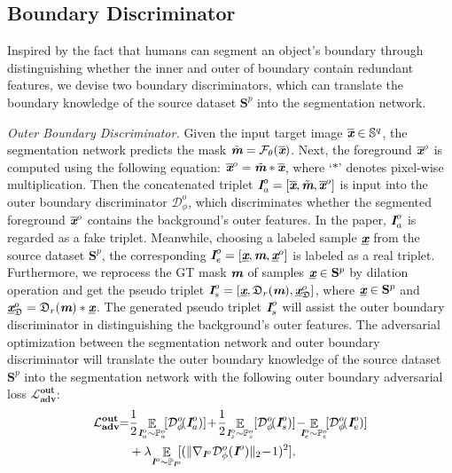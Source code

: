 \documentclass[letterpaper]{article} %
\begin{document}
\subsection{Boundary Discriminator}
Inspired by the fact that humans can segment an object's boundary through distinguishing whether the inner and outer of boundary contain redundant features, we devise two boundary discriminators, which can translate the boundary knowledge of the source dataset $\mathbf{S}^p$ into the segmentation network.

\emph{Outer Boundary Discriminator.}
Given the input target image $\overline{\textbf{\em x}}\in \mathbb{S}^q$, the segmentation network predicts the mask $\tilde{\textbf{\em m}}=\mathcal{F}_{\theta}(\overline{\textbf{\em x}})$. Next, the foreground $\overline{\textbf{\em x}}^o$ is computed using the following equation: $\overline{\textbf{\em x}}^o=\tilde{\textbf{\em m}}*\overline{\textbf{\em x}}$, where `$*$' denotes pixel-wise multiplication. Then the concatenated triplet $\textbf{\em I}^o_a=[\overline{\textbf{\em x}},\tilde{\textbf{\em m}},\overline{\textbf{\em x}}^o]$ is input into the outer boundary discriminator $\mathcal{D}^o_{\phi}$, which discriminates whether the segmented foreground $\overline{\textbf{\em x}}^o$ contains the background's outer features. In the paper, $\textbf{\em I}^o_a$ is regarded as a fake triplet.
Meanwhile, choosing a labeled sample $\underline{\textbf{\em x}}$ from the source dataset $\mathbf{S}^p$, the corresponding $\textbf{\em I}^o_e=[\underline{\textbf{\em x}},\textbf{\em m},\underline{\textbf{\em x}}^o]$ is labeled as a real triplet.
Furthermore, we reprocess the GT mask $\textbf{\em m}$ of samples $\underline{\textbf{\em x}}\in \mathbf{S}^p$ by dilation operation and get the pseudo triplet $\textbf{\em I}^o_s=[\underline{\textbf{\em x}},\mathfrak{D}_r(\textbf{\em m}),\underline{\textbf{\em x}}^o_{\mathfrak{D}}]$, where $ \underline{\textbf{\em x}}\in \mathbf{S}^p$ and $\underline{\textbf{\em x}}^o_{\mathfrak{D}}=\mathfrak{D}_r(\textbf{\em m})*\underline{\textbf{\em x}}$.
The generated pseudo triplet $\textbf{\em I}^o_s$ will assist the outer boundary discriminator in distinguishing the background's outer features.
The adversarial optimization between the segmentation network and outer boundary discriminator will translate the outer boundary knowledge of the source dataset $\mathbf{S}^p$ into the segmentation network with the following outer boundary adversarial loss $\mathbf{\mathcal{L}^{out}_{adv}}$:
\begin{equation}\label{eq4}
\begin{split}
\mathbf{\mathcal{L}^{out}_{adv}}\!\!= & \frac{1}{2}\!\mathop{\mathbb{E}}\limits_{\mathbi{I}^o_a \sim \mathbb{P}^o_a}\![\mathcal{D}^o_{\phi}\!(\mathbi{I}^o_a)]\!+\!
\frac{1}{2}\!\mathop{\mathbb{E}}\limits_{\mathbi{I}^o_s \sim \mathbb{P}^o_s} [\mathcal{D}^{o}_{\phi}\!(\mathbi{I}^o_s)]\! -\!\!\!\!\mathop{\mathbb{E}}\limits_{\mathbi{I}^o_e \sim \mathbb{P}^o_e}\![\mathcal{D}^{o}_{\phi}\!(\mathbi{I}^o_e)] \\
& +\lambda \! \mathop{\mathbb{E}}\limits_{\mathbi{I}^o\sim \mathbb{P}_{\mathbi{I}^o}}\!\![(\|\nabla_{\mathbi{I}^o} \mathcal{D}^{o}_{\phi}(\mathbi{I}^o)\|_{2}\!-\!1)^2],
\end{split}
\end{equation}
\end{document}
